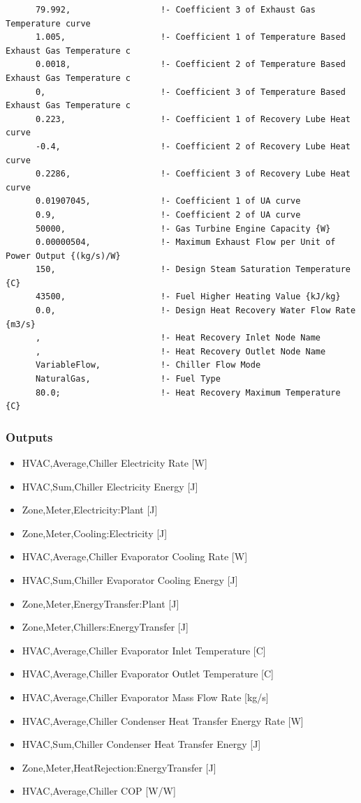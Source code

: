 \begin{lstlisting}
      79.992,                  !- Coefficient 3 of Exhaust Gas Temperature curve
      1.005,                   !- Coefficient 1 of Temperature Based Exhaust Gas Temperature c
      0.0018,                  !- Coefficient 2 of Temperature Based Exhaust Gas Temperature c
      0,                       !- Coefficient 3 of Temperature Based Exhaust Gas Temperature c
      0.223,                   !- Coefficient 1 of Recovery Lube Heat curve
      -0.4,                    !- Coefficient 2 of Recovery Lube Heat curve
      0.2286,                  !- Coefficient 3 of Recovery Lube Heat curve
      0.01907045,              !- Coefficient 1 of UA curve
      0.9,                     !- Coefficient 2 of UA curve
      50000,                   !- Gas Turbine Engine Capacity {W}
      0.00000504,              !- Maximum Exhaust Flow per Unit of Power Output {(kg/s)/W}
      150,                     !- Design Steam Saturation Temperature {C}
      43500,                   !- Fuel Higher Heating Value {kJ/kg}
      0.0,                     !- Design Heat Recovery Water Flow Rate {m3/s}
      ,                        !- Heat Recovery Inlet Node Name
      ,                        !- Heat Recovery Outlet Node Name
      VariableFlow,            !- Chiller Flow Mode
      NaturalGas,              !- Fuel Type
      80.0;                    !- Heat Recovery Maximum Temperature {C}
\end{lstlisting}

\subsubsection{Outputs}\label{outputs-7-006}

\begin{itemize}
\item
  HVAC,Average,Chiller Electricity Rate {[}W{]}
\item
  HVAC,Sum,Chiller Electricity Energy {[}J{]}
\item
  Zone,Meter,Electricity:Plant {[}J{]}
\item
  Zone,Meter,Cooling:Electricity {[}J{]}
\item
  HVAC,Average,Chiller Evaporator Cooling Rate {[}W{]}
\item
  HVAC,Sum,Chiller Evaporator Cooling Energy {[}J{]}
\item
  Zone,Meter,EnergyTransfer:Plant {[}J{]}
\item
  Zone,Meter,Chillers:EnergyTransfer {[}J{]}
\item
  HVAC,Average,Chiller Evaporator Inlet Temperature {[}C{]}
\item
  HVAC,Average,Chiller Evaporator Outlet Temperature {[}C{]}
\item
  HVAC,Average,Chiller Evaporator Mass Flow Rate {[}kg/s{]}
\item
  HVAC,Average,Chiller Condenser Heat Transfer Energy Rate {[}W{]}
\item
  HVAC,Sum,Chiller Condenser Heat Transfer Energy {[}J{]}
\item
  Zone,Meter,HeatRejection:EnergyTransfer {[}J{]}
\item
  HVAC,Average,Chiller COP {[}W/W{]}
\end{itemize}

